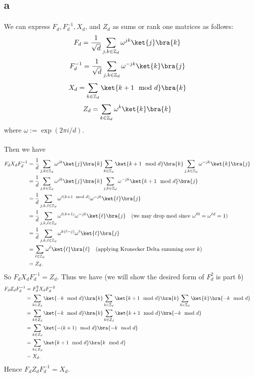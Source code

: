 \documentclass[letterpaper,12pt,oneside,onecolumn]{article}
\begin{document}
\subsection{a}
\paragraph{}
We can express $F_d, F_d^{-1}, X_d$, and $Z_d$ as sums or rank one matrices as follows:
$$F_d = \frac{1}{\sqrt{d}} \sum_{j,k \in \Z_d} \omega^{j k} \ket{j}\bra{k}$$
$$F_d^{-1} = \frac{1}{\sqrt{d}} \sum_{j,k \in \Z_d} \omega^{- j k} \ket{k}\bra{j}$$
$$X_d = \sum_{k \in \Z_d} \ket{k+1 \mod d} \bra{k}$$
$$Z_d = \sum_{k \in \Z_d} \omega^k \ket{k}\bra{k}$$
where $\omega := \exp(2\pi i / d)$.
\paragraph{}
Then we have
\begin{align*}
F_dX_dF_d^{-1} &= \frac{1}{d} \sum_{j,k \in \Z_d} \omega^{j k} \ket{j}\bra{k}\sum_{k \in \Z_d} \ket{k+1 \mod d} \bra{k}\sum_{j,k \in \Z_d} \omega^{- j k} \ket{k}\bra{j}\\
&= \frac{1}{d} \sum_{j,k \in \Z_d} \omega^{j k} \ket{j}\bra{k} \sum_{j,k \in \Z_d} \omega^{- j k} \ket{k+1 \mod d}\bra{j} \\
&= \frac{1}{d} \sum_{j,k,\ell \in \Z_d}\omega^{\ell(k+1\mod d)}\omega^{-jk}\ket{\ell}\bra{j} \\
&=\frac{1}{d} \sum_{j,k,\ell \in \Z_d}\omega^{\ell(k+1)}\omega^{-jk}\ket{\ell}\bra{j}  \quad\text{(we may drop mod since $\omega^{\ell 0 } = \omega^{\ell d} = 1$)} \\
&= \frac{1}{d} \sum_{j,k,\ell \in \Z_d}\omega^{k(\ell-j)}\omega^{\ell}\ket{\ell}\bra{j} \\
&= \sum_{\ell \in \Z_d} \omega^\ell \ket{\ell}\bra{\ell} \quad \text{(applying Kronecker Delta summing over $k$)} \\
&= Z_d.
\end{align*}
So $F_d X_d F_d^{-1} = Z_d$. Thus we have (we will show the desired form of $F_d^2$ is part $b$)
\begin{align*}
F_dZ_d F_d^{-1} &= F_d^2 X_d F_d^{-2} \\
&= \sum_{k \in Z_d} \ket{-k \mod d} \bra{k} \sum_{k \in \Z_d} \ket{k+1 \mod d}\bra{k} \sum_{k \in \Z_d} \ket{k}\bra{-k\mod d} \\
&= \sum_{k \in Z_d} \ket{-k \mod d} \bra{k} \sum_{k \in Z_d}\ket{k+1 \mod d}\bra{-k \mod d} \\
&= \sum_{k \in Z_d} \ket{-(k+1) \mod d} \bra{- k \mod d} \\
&= \sum_{k \in Z_d} \ket{k+1 \mod d} \bra{k \mod d} \\
&= X_d.
\end{align*}
Hence $F_d Z_d F_d^{-1} = X_d$.
\end{document}

